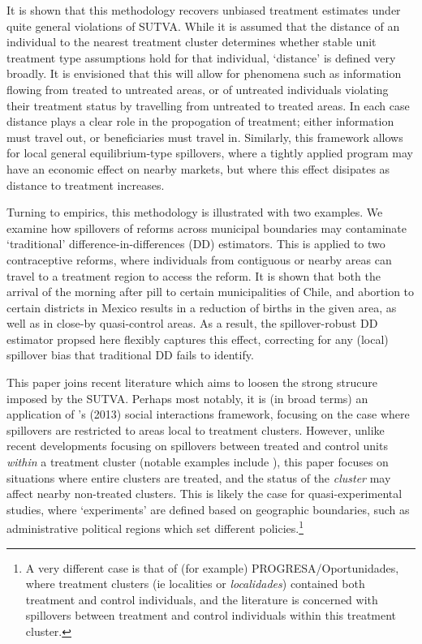\documentclass{article}
\begin{document}
\begin{spacing}{1.1}
It is shown that this methodology recovers unbiased treatment
estimates under quite general violations of SUTVA.  While it is
assumed that the distance of an individual to the nearest treatment
cluster determines whether stable unit treatment type assumptions hold
for that individual, `distance' is defined very broadly.  It is
envisioned that this will allow for phenomena such as information
flowing from treated to untreated areas, or of untreated individuals
violating their treatment status by travelling from untreated to
treated areas.  In each case distance plays a clear role in the
propogation of treatment; either information must travel out, or
beneficiaries must travel in. Similarly, this framework allows for
local general equilibrium-type spillovers, where a tightly applied
program may have an economic effect on nearby markets, but where this
effect disipates as distance to treatment increases.

Turning to empirics, this methodology is illustrated with two examples.
We examine how spillovers of reforms across municipal boundaries may 
contaminate `traditional' difference-in-differences (DD) estimators.  This is 
applied to two contraceptive reforms, where individuals from contiguous or nearby 
areas can travel to a treatment region to access the reform.  It is shown that 
both the arrival of the morning after pill to certain municipalities of Chile, 
and abortion to certain districts in Mexico results in a reduction of births in 
the given area, as well as in close-by quasi-control areas.  As a result, the 
spillover-robust DD estimator propsed here flexibly captures this effect, 
correcting for any (local) spillover bias that traditional DD fails to 
identify.

This paper joins recent literature which aims to loosen the strong strucure 
imposed by the SUTVA.  Perhaps most notably, it is (in broad terms) an 
application of \citeauthor{Manski2013}'s (2013) social interactions framework, 
focusing on the case where spillovers are restricted to areas local to treatment 
clusters.  However, unlike recent developments focusing on spillovers 
between treated and control units \emph{within} a treatment cluster (notable
examples include \citet{McIntosh2008,Bairdetal2014,AngelucciDiMaro2010}), this 
paper focuses on situations where entire clusters are treated, and the status
of the \emph{cluster} may affect nearby non-treated clusters.  This is likely
the case for quasi-experimental studies, where `experiments' are defined based
on geographic boundaries, such as administrative political regions which set 
different policies.\footnote{A very different case is that of (for example)
PROGRESA/Oportunidades, where treatment clusters (ie localities or 
\emph{localidades}) contained both treatment and control individuals, and the
literature is concerned with spillovers between treatment and control individuals
within this treatment cluster.}


\end{spacing}
\end{document}

